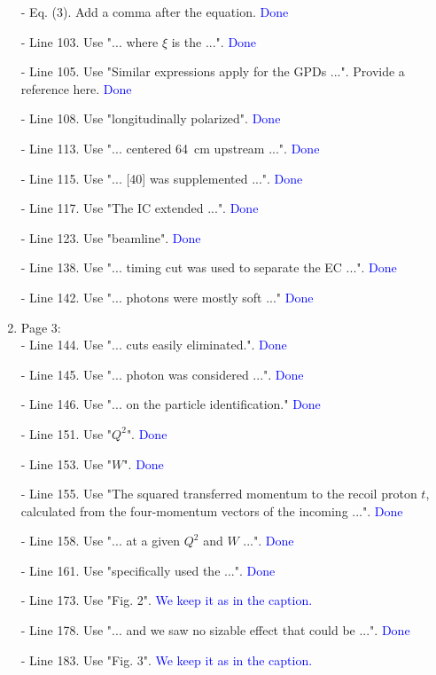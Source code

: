 \documentclass[a4paper,11pt,twoside]{article}
\begin{document}
\begin{enumerate}
 - Eq. (3). Add a comma after the equation.
   \textcolor{blue}{Done}
 
 - Line 103. Use "... where $\xi$ is the ...".
    \textcolor{blue}{Done}
 
 - Line 105. Use "Similar expressions apply for the GPDs ...". Provide a 
   reference here.
     \textcolor{blue}{Done}
 
 - Line 108. Use "longitudinally polarized".
      \textcolor{blue}{Done}
 
- Line 113. Use "... centered 64~cm upstream ...".
      \textcolor{blue}{Done}
 
- Line 115. Use "... [40] was supplemented ...".
      \textcolor{blue}{Done}
 
- Line 117. Use "The IC extended ...".
      \textcolor{blue}{Done}
 
- Line 123. Use "beamline".
      \textcolor{blue}{Done}
 
- Line 138. Use "... timing cut was used to separate the EC ...".
      \textcolor{blue}{Done}
 
- Line 142. Use "... photons were mostly soft ..."
     \textcolor{blue}{Done}
~\\
  \item Page 3:\\
 - Line 144. Use "... cuts easily eliminated.".
    \textcolor{blue}{Done}

- Line 145. Use "... photon was considered ...".
     \textcolor{blue}{Done }

- Line 146. Use "... on the particle identification."
     \textcolor{blue}{Done }

- Line 151. Use "$Q^2$".
     \textcolor{blue}{Done}

- Line 153. Use "$W$".
     \textcolor{blue}{Done }

- Line 155. Use "The squared transferred momentum to the recoil proton $t$, 
  calculated from the four-momentum vectors of the incoming ...".
     \textcolor{blue}{Done }

- Line 158. Use "... at a given $Q^2$ and $W$ ...".
     \textcolor{blue}{Done}

- Line 161. Use "specifically used the ...".
     \textcolor{blue}{Done}

- Line 173. Use "Fig. 2".
     \textcolor{blue}{We keep it as in the caption.}

- Line 178. Use "... and we saw no sizable effect that could be ...".
     \textcolor{blue}{Done}

- Line 183. Use "Fig. 3".
     \textcolor{blue}{We keep it as in the caption.}


\end{enumerate}
\end{document}
